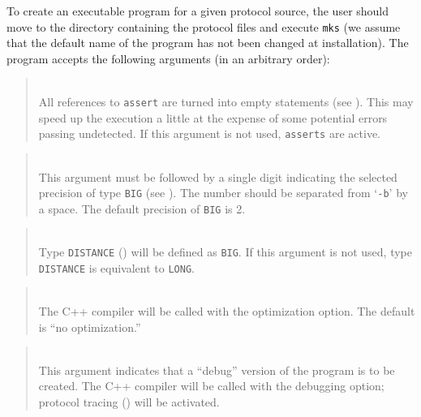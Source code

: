 To create an executable program for a given protocol source, the user
should move to the directory containing the protocol files and execute
{\tt mks} (we assume that the default name of the program has not been
changed at installation).
The program accepts the following arguments (in an arbitrary order):

\medskip

\begin{quote}
\noindent{}\\ \hspace{0in}
All references to {\tt assert} are turned into empty statements
(see ).
This may speed up the execution a little at the expense of some potential
errors passing undetected.
If this argument is not used, {\tt asserts} are active.
\end{quote}

\begin{quote}
\noindent{}\\ \hspace{0in}
This argument must be followed by a single digit indicating the selected
precision of type {\tt BIG} (see ).
The number should be separated from `{\tt -b}' by a space.
The default precision of {\tt BIG} is 2.
\end{quote}

\begin{quote}
\noindent{}\\ \hspace{0in}
Type {\tt DISTANCE} () will be defined as {\tt BIG}.
If this argument is not used, type {\tt DISTANCE} is equivalent to {\tt LONG}.
\end{quote}

\begin{quote}
\noindent{}\\ \hspace{0in}
The C++ compiler will be called with the optimization option.
The default is ``no optimization.''
\end{quote}

\begin{quote}
\noindent{}\\ \hspace{0in}
This argument indicates that a ``debug'' version of the program is to be
created.
The C++ compiler will be called with the debugging option;
protocol tracing () will be activated.
\end{quote}

